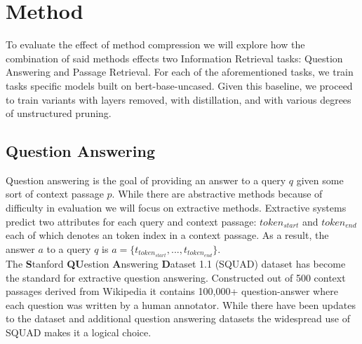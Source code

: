 \section{Method}
To evaluate the effect of method compression we will explore how the combination of said methods effects two Information Retrieval tasks: Question Answering and Passage Retrieval. For each of the aforementioned tasks, we train tasks specific models built on bert-base-uncased. Given this baseline, we proceed to train variants with layers removed, with distillation, and with various degrees of unstructured pruning.
\subsection{Question Answering}
Question answering is the goal of providing an answer to a query $q$ given some sort of context passage $p$. While there are abstractive methods because of difficulty in evaluation we will focus on extractive methods. Extractive systems predict two attributes for each query and context passage: $token_{start}$ and $token_{end}$ each of which denotes an token index in a context passage. As a result, the answer $a$ to a query $q$ is $a=\{t_{token_{start}},...,t_{token_{end}}\}$. \\
The \textbf{S}tanford \textbf{QU}estion \textbf{A}nswering \textbf{D}ataset 1.1 (SQUAD) dataset has become the standard for extractive question answering. Constructed out of 500 context passages derived from Wikipedia it contains 100,000+ question-answer where each question was written by a human annotator. While there have been updates to the dataset and additional question answering datasets the widespread use of SQUAD makes it a logical choice. \\

